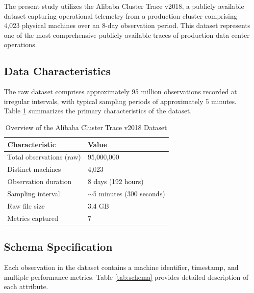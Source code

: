 \documentclass[12pt]{report}
\begin{document}
The present study utilizes the Alibaba Cluster Trace v2018, a publicly available dataset capturing operational telemetry from a production cluster comprising 4,023 physical machines over an 8-day observation period. This dataset represents one of the most comprehensive publicly available traces of production data center operations.

\subsection{Data Characteristics}

The raw dataset comprises approximately 95 million observations recorded at irregular intervals, with typical sampling periods of approximately 5 minutes. Table \ref{tab:dataset_overview} summarizes the primary characteristics of the dataset.

\begin{table}[H]
\centering
\caption{Overview of the Alibaba Cluster Trace v2018 Dataset}
\label{tab:dataset_overview}
\begin{tabular}{ll}
\toprule
\textbf{Characteristic} & \textbf{Value} \\
\midrule
Total observations (raw) & 95,000,000 \\
Distinct machines & 4,023 \\
Observation duration & 8 days (192 hours) \\
Sampling interval & $\sim$5 minutes (300 seconds) \\
Raw file size & 3.4 GB \\
Metrics captured & 7 \\
\bottomrule
\end{tabular}
\end{table}

\subsection{Schema Specification}

Each observation in the dataset contains a machine identifier, timestamp, and multiple performance metrics. Table \ref{tab:schema} provides detailed description of each attribute.
\end{document}
